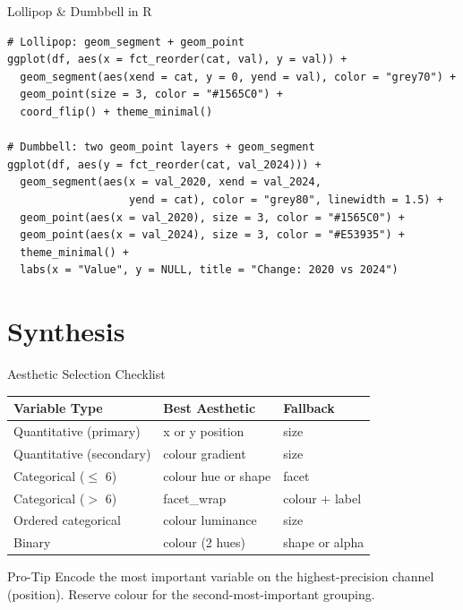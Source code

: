 \documentclass[10pt]{beamer}
\begin{document}
\begin{frame}[fragile]{Lollipop \& Dumbbell in R}
\begin{lstlisting}[style=rstyle]
# Lollipop: geom_segment + geom_point
ggplot(df, aes(x = fct_reorder(cat, val), y = val)) +
  geom_segment(aes(xend = cat, y = 0, yend = val), color = "grey70") +
  geom_point(size = 3, color = "#1565C0") +
  coord_flip() + theme_minimal()

# Dumbbell: two geom_point layers + geom_segment
ggplot(df, aes(y = fct_reorder(cat, val_2024))) +
  geom_segment(aes(x = val_2020, xend = val_2024,
                   yend = cat), color = "grey80", linewidth = 1.5) +
  geom_point(aes(x = val_2020), size = 3, color = "#1565C0") +
  geom_point(aes(x = val_2024), size = 3, color = "#E53935") +
  theme_minimal() +
  labs(x = "Value", y = NULL, title = "Change: 2020 vs 2024")
\end{lstlisting}
\end{frame}

\section{Synthesis}

\begin{frame}{Aesthetic Selection Checklist}
  \centering
  \begin{tabular}{lll}
    \toprule
    \textbf{Variable Type} & \textbf{Best Aesthetic} & \textbf{Fallback} \\
    \midrule
    Quantitative (primary) & x or y position & size \\
    Quantitative (secondary) & colour gradient & size \\
    Categorical ($\leq$ 6) & colour hue or shape & facet \\
    Categorical ($>$ 6) & facet\_wrap & colour + label \\
    Ordered categorical & colour luminance & size \\
    Binary & colour (2 hues) & shape or alpha \\
    \bottomrule
  \end{tabular}
  \vspace{6pt}
  \begin{alertblock}{Pro-Tip}
    Encode the most important variable on the highest-precision channel
    (position). Reserve colour for the second-most-important grouping.
  \end{alertblock}
\end{frame}
\end{document}
